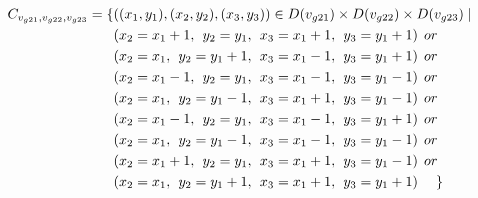 \begin{align*}
C_{v_{g21},v_{g22},v_{g23}}=\{&((x_{1},y_{1}),(x_{2},y_{2}),(x_{3},y_{3}))\in D(v_{g21})\times D(v_{g22})\times D(v_{g23})\mid\\
&(x_{2} = x_{1}+1,\hspace{1ex}y_{2} = y_{1},\hspace{1ex}x_{3} = x_{1}+1, \hspace{1ex}y_{3} = y_{1}+1)\hspace{1ex} or\\
&(x_{2} = x_{1},\hspace{1ex}y_{2} = y_{1}+1,\hspace{1ex}x_{3} = x_{1}-1, \hspace{1ex}y_{3} = y_{1}+1)\hspace{1ex} or\\
&(x_{2} = x_{1}-1,\hspace{1ex}y_{2} = y_{1},\hspace{1ex}x_{3} = x_{1}-1,\hspace{1ex} y_{3} = y_{1}-1)\hspace{1ex} or\\
&(x_{2} = x_{1},\hspace{1ex}y_{2} = y_{1}-1,\hspace{1ex}x_{3} = x_{1}+1, \hspace{1ex}y_{3} = y_{1}-1)\hspace{1ex} or\\
&(x_{2} = x_{1}-1,\hspace{1ex}y_{2} = y_{1},\hspace{1ex}x_{3} = x_{1}-1, \hspace{1ex}y_{3} = y_{1}+1)\hspace{1ex} or\\
&(x_{2} = x_{1},\hspace{1ex}y_{2} = y_{1}-1,\hspace{1ex}x_{3} = x_{1}-1, \hspace{1ex}y_{3} = y_{1}-1)\hspace{1ex} or\\
&(x_{2} = x_{1}+1,\hspace{1ex}y_{2} = y_{1},\hspace{1ex}x_{3} = x_{1}+1, \hspace{1ex}y_{3} = y_{1}-1)\hspace{1ex} or\\
&(x_{2} = x_{1},\hspace{1ex}y_{2} = y_{1}+1,\hspace{1ex}x_{3} = x_{1}+1, \hspace{1ex}y_{3} = y_{1}+1) \hspace{3ex} \}
\end{align*}
